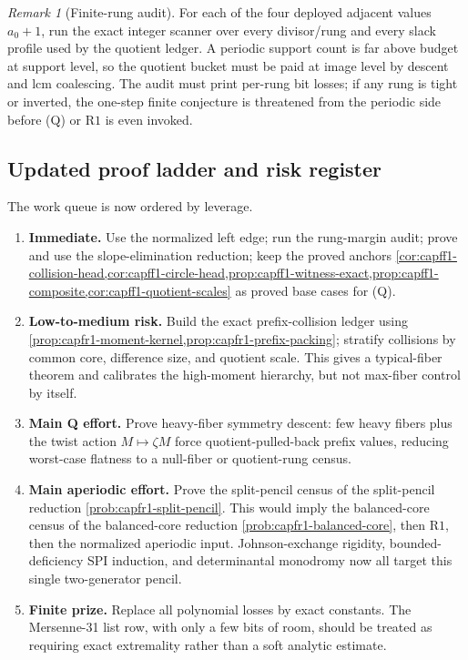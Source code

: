 \documentclass[11pt]{article}
\theoremstyle{definition}
\theoremstyle{remark}
\newtheorem{remark}[remark]{Remark}
\providecommand{\Rone}{\mathrm{R1}}
\begin{document}
\begin{remark}[Finite-rung audit]\label{prob:capfr1-rung-audit}
For each of the four deployed adjacent values \(a_0+1\), run the exact integer scanner over every divisor/rung and every slack profile used by the quotient ledger.  A periodic support count is far above budget at support level, so the quotient bucket must be paid at image level by descent and lcm coalescing.  The audit must print per-rung bit losses; if any rung is tight or inverted, the one-step finite conjecture is threatened from the periodic side before \textup{(Q)} or \(\Rone\) is even invoked.
\end{remark}

\subsection{Updated proof ladder and risk register}\label{subsec:capfr1-risk}

The work queue is now ordered by leverage.
\begin{enumerate}[label=\textup{(\arabic*)},leftmargin=2.4em]
\item \textbf{Immediate.} Use the normalized left edge; run the rung-margin audit; prove and use the slope-elimination reduction; keep the proved anchors \cref{cor:capff1-collision-head,cor:capff1-circle-head,prop:capff1-witness-exact,prop:capff1-composite,cor:capff1-quotient-scales} as proved base cases for \textup{(Q)}.
\item \textbf{Low-to-medium risk.} Build the exact prefix-collision ledger using \cref{prop:capfr1-moment-kernel,prop:capfr1-prefix-packing}; stratify collisions by common core, difference size, and quotient scale.  This gives a typical-fiber theorem and calibrates the high-moment hierarchy, but not max-fiber control by itself.
\item \textbf{Main Q effort.} Prove heavy-fiber symmetry descent: few heavy fibers plus the twist action \(M\mapsto\zeta M\) force quotient-pulled-back prefix values, reducing worst-case flatness to a null-fiber or quotient-rung census.
\item \textbf{Main aperiodic effort.} Prove the split-pencil census of the split-pencil reduction \cref{prob:capfr1-split-pencil}.  This would imply the balanced-core census of the balanced-core reduction \cref{prob:capfr1-balanced-core}, then \(\Rone\), then the normalized aperiodic input.  Johnson-exchange rigidity, bounded-deficiency SPI induction, and determinantal monodromy now all target this single two-generator pencil.
\item \textbf{Finite prize.} Replace all polynomial losses by exact constants.  The Mersenne-31 list row, with only a few bits of room, should be treated as requiring exact extremality rather than a soft analytic estimate.
\end{enumerate}
\end{document}
